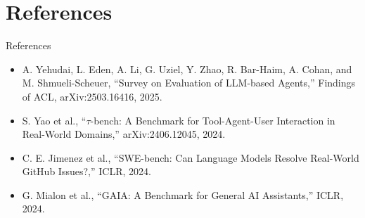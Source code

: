 \documentclass{beamer}
\begin{document}
\section{References}
\begin{frame}{References}
\footnotesize
\begin{itemize}
\item A. Yehudai, L. Eden, A. Li, G. Uziel, Y. Zhao, R. Bar-Haim, A. Cohan, and M. Shmueli-Scheuer, ``Survey on Evaluation of LLM-based Agents,'' Findings of ACL, arXiv:2503.16416, 2025.
\item S. Yao et al., ``$\tau$-bench: A Benchmark for Tool-Agent-User Interaction in Real-World Domains,'' arXiv:2406.12045, 2024.
\item C. E. Jimenez et al., ``SWE-bench: Can Language Models Resolve Real-World GitHub Issues?,'' ICLR, 2024.
\item G. Mialon et al., ``GAIA: A Benchmark for General AI Assistants,'' ICLR, 2024.
\end{itemize}
\end{frame}
\begin{frame}\vfill{}\vfill\end{frame}
\end{document}
